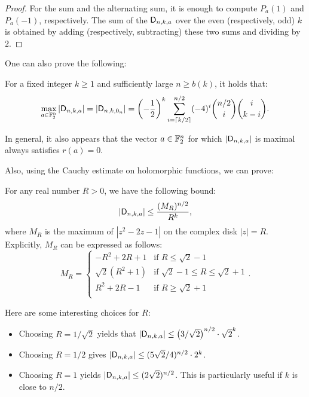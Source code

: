 \documentclass[11pt]{llncs}
\begin{document}
\begin{proof}
	For the sum and the alternating sum, it is enough to compute $P_a(1)$ and $P_a(-1)$, respectively. The sum of the $\mathsf{D}_{n,k,a}$ over the even (respectively, odd) $k$ is obtained by adding (respectively, subtracting) these two sums and dividing by $2$.
\end{proof}




One can also prove the following:

\begin{Prop}
    For a fixed integer $k\geq 1$ and sufficiently large $n\geq b(k)$, it holds that:
    \[
        \max_{a\in\mathbb{F}_2^n}|\mathsf{D}_{n,k,a}|=|\mathsf{D}_{n,k,0_n}|=\left(-\frac12\right)^k\sum_{i=\lceil k/2\rceil}^{n/2}(-4)^i\binom{n/2}{i}\binom{i}{k-i}.
    \]
\end{Prop}

\begin{remark}
    In general, it also appears that the vector $a\in\mathbb{F}_2^n$ for which $|\mathsf{D}_{n,k,a}|$ is maximal always satisfies $r(a)=0$.
\end{remark}

Also, using the Cauchy estimate on holomorphic functions, we can prove:

\begin{Prop}
    For any real number $R>0$, we have the following bound:
    \[
        |\mathsf{D}_{n,k,a}|\leq\frac{(M_R)^{n/2}}{R^k},
    \]
    where $M_R$ is the maximum of $\left|z^2-2z-1\right|$ on the complex disk $|z|=R$. Explicitly, $M_R$ can be expressed as follows:
    \[
        M_R=
        \begin{cases}
            -R^2+2R+1&\text{if $R\leq\sqrt 2-1$}\\
            \sqrt 2\left(R^2+1\right)&\text{if $\sqrt 2-1\leq R\leq\sqrt 2+1$}\\
            R^2+2R-1&\text{if $R\geq\sqrt 2+1$}\\
        \end{cases}.
    \]
\end{Prop}

\begin{remark}
    Here are some interesting choices for $R$:
    \begin{itemize}
        \item Choosing $R=1/\sqrt 2$ yields that $|\mathsf{D}_{n,k,a}|\leq\left(3/\sqrt 2\right)^{n/2}\cdot \sqrt 2^k$.
        \item Choosing $R=1/2$ gives $|\mathsf{D}_{n,k,a}|\leq (5\sqrt 2/4)^{n/2}\cdot 2^k$.
        \item Choosing $R=1$ yields $|\mathsf{D}_{n,k,a}|\leq (2\sqrt 2)^{n/2}$. This is particularly useful if $k$ is close to $n/2$.
    \end{itemize}
\end{remark}
\end{document}
